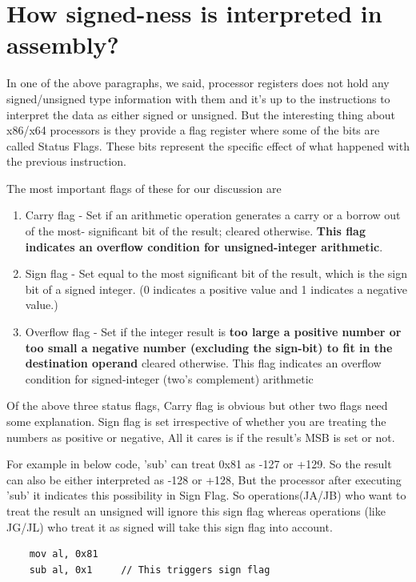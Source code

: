 \documentclass{article}
\begin{document}
\section{How signed-ness is interpreted in assembly?}
In one of the above paragraphs, we said, processor registers does not hold any
signed/unsigned type information with them and it's up to the instructions to
interpret the data as either signed or unsigned. But the interesting thing
about x86/x64 processors is they provide a flag register where some of the
bits are called Status Flags. These bits represent the specific effect of
what happened with the previous instruction.

The most important flags of these for our discussion are

\begin{enumerate}[noitemsep]
    \item Carry flag - Set if an arithmetic operation generates a carry or a borrow out of the most-
significant bit of the result; cleared otherwise. \textbf{This flag indicates
an overflow condition for unsigned-integer arithmetic}.
    \item Sign flag - Set equal to the most significant bit of the result, which is the sign bit of a signed
integer. (0 indicates a positive value and 1 indicates a negative value.)
    \item Overflow flag - Set if the integer result is \textbf{too large a
    positive number or too small a negative number (excluding the sign-bit) to
    fit in the destination operand} cleared otherwise. This flag
indicates an overflow condition for signed-integer (two's complement) arithmetic
\end{enumerate}

Of the above three status flags, Carry flag is obvious but other two flags need
some explanation. Sign flag is set irrespective of whether you are treating the
numbers as positive or negative, All it cares is if the result's MSB is set or
not.

For example in below code, 'sub' can treat 0x81 as -127 or +129. So the result
can also be either interpreted as -128 or +128, But the processor after
executing 'sub' it indicates this possibility in Sign Flag. So operations(JA/JB)
who want to treat the result an unsigned will ignore this sign flag whereas
operations (like JG/JL) who treat it as signed will take this sign flag into
account.
\begin{verbatim}
    mov al, 0x81
    sub al, 0x1     // This triggers sign flag
\end{verbatim}
\end{document}
